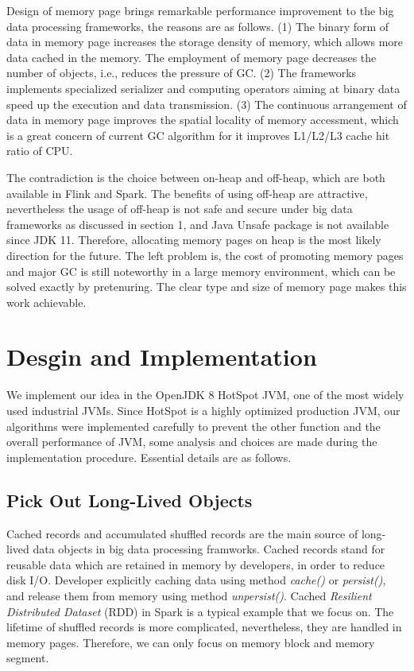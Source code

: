 \documentclass[sigplan, screen]{acmart}
\begin{document}
Design of memory page brings remarkable performance improvement to the big data processing frameworks, the reasons are as follows. (1) The binary form of data in memory page increases the storage density of memory, which allows more data cached
in the memory. The employment of memory page decreases the number of objects, i.e., reduces the pressure of GC. (2) The frameworks implements specialized serializer and computing
operators aiming at binary data speed up the execution and data transmission. (3) The continuous arrangement of data in memory page improves the spatial locality of memory accessment, 
 which is a great concern of current GC algorithm for it improves L1/L2/L3 cache hit ratio of CPU\cite{yang2020improving,li2019scissorgc}. 
 
 The contradiction is the choice between on-heap and off-heap, which are both available in Flink and Spark. The benefits of using off-heap are attractive, nevertheless the usage of off-heap is not safe and secure under big data frameworks as discussed in section 1, and Java Unsafe package is not available since JDK 11\cite{UnsafeRemove}. 
 Therefore, allocating memory pages on heap is the most likely direction for the future. The left problem is, the cost of promoting memory pages and major GC is still noteworthy
 in a large memory environment\cite{MinorGCLong}, which can be solved exactly by pretenuring. The clear type and size of memory page makes this work achievable.

\section{Desgin and Implementation}
  We implement our idea in the OpenJDK 8 HotSpot JVM, one of the most widely used industrial JVMs. Since HotSpot is a highly optimized production JVM, our algorithms were implemented carefully
to prevent the other function and the overall performance of JVM, some analysis and choices are made during the implementation procedure. Essential details are as follows.

\subsection{Pick Out Long-Lived Objects}
  Cached records and accumulated shuffled records are the main source of long-lived data objects in big data processing framworks\cite{xu2019experimental}. Cached records stand for
reusable data which are retained in memory by developers, in order to reduce disk I/O. Developer explicitly caching data using method \emph{cache()} or \emph{persist()}, and release them 
from memory using method \emph{unpersist()}. Cached \emph{Resilient Distributed Dataset} (RDD) in Spark is a typical example that we focus on. The lifetime of shuffled records
is more complicated, nevertheless, they are handled in memory pages. Therefore, we can only focus on memory block and memory segment.
\end{document}
